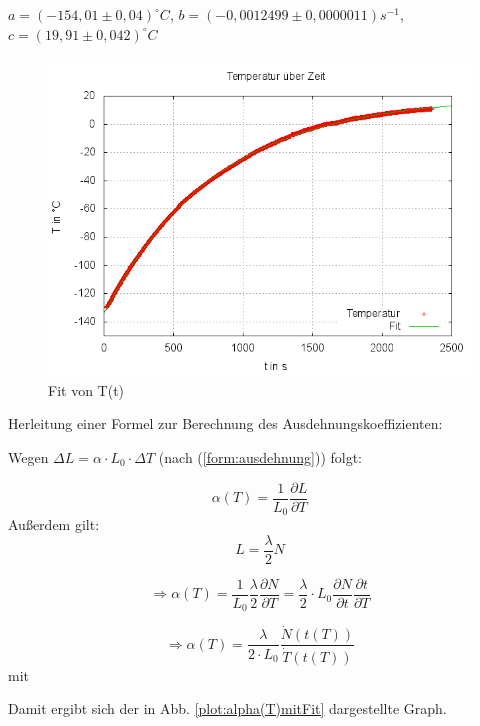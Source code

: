 $a = (-154,01 \pm 0,04)^{\circ}C$,
$b=(-0,0012499 \pm 0,0000011)s^{-1}$,
$c=(19,91 \pm 0,042)^{\circ}C$ \\


\begin{figure}
\centering
        \includegraphics[width=.8\textwidth]{images/Fit_T(t).png}
\caption{Fit von T(t)}
\label{Fit T(t)}
\end{figure}


Herleitung einer Formel zur Berechnung des Ausdehnungskoeffizienten:

Wegen $ \Delta L = \alpha \cdot L_{0} \cdot \Delta T $  (nach (\ref{form:ausdehnung})) folgt: 

\begin{equation}
\alpha (T) = \frac{1}{L_{0}} \frac{\partial L}{\partial T}
\end{equation}
Außerdem gilt: 
\begin{equation}
L = \frac{\lambda}{2} N
\end{equation}

\begin{equation}
\Rightarrow \alpha(T) = \frac{1}{L_{0}} \frac{\lambda}{2} \frac{\partial N}{\partial T} = \frac{\lambda}{2} \cdot L_{0} \frac{\partial N}{\partial t} \frac{\partial t}{\partial T}
\end{equation}

\begin{equation}
\Rightarrow \alpha (T) = \frac{\lambda}{2 \cdot L_{0}} \frac{\dot{N}(t(T))}{\dot{T}(t(T))}
\end{equation} 
mit 

Damit ergibt sich der in Abb. \ref{plot:alpha(T)mitFit} dargestellte Graph. 


